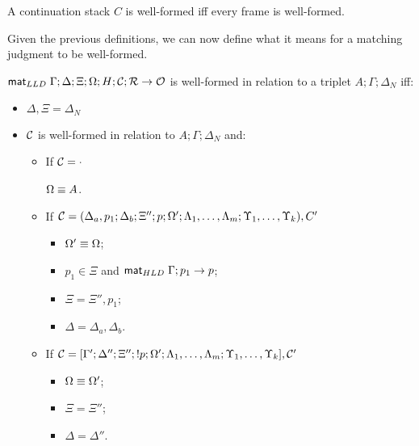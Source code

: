 \begin{definition}
A continuation stack $C$ is well-formed iff every frame is well-formed.
\end{definition}

Given the previous definitions, we can now define what it means for a matching
judgment to be well-formed.

\begin{definition}

$\mathsf{mat}_{LLD} \; \Gamma; \Delta; \Xi; \Omega; H; \mathcal{C}; \mathcal{R} \rightarrow \mathcal{O}$
is well-formed in relation to a triplet $A; \Gamma; \Delta_{N}$ iff:

\begin{itemize}[leftmargin=*]
   \item $\Delta, \Xi = \Delta_{N}$
   \item $\mathcal{C}$ is well-formed in relation to $A; \Gamma; \Delta_{N}$ and:
   \begin{itemize}[leftmargin=\secondm]
      \item If $\mathcal{C} = \cdot$
   
      $\Omega \equiv A$.
   
      \item If $\mathcal{C} = (\Delta_a, p_1; \Delta_b; \Xi''; p; \Omega'; \Lambda_1,
            \dotsc, \Lambda_m; \Upsilon_1, \dotsc, \Upsilon_k), C'$
   
      \begin{itemize}[leftmargin=\thirdm]
         \item $\Omega' \equiv \Omega$;
         \item $p_1 \in \Xi$ and $\mathsf{mat}_{HLD} \; \Gamma; p_1 \rightarrow p$;
         \item $\Xi = \Xi'', p_1$;
         \item $\Delta = \Delta_a, \Delta_b$.
      \end{itemize}
      \item If $\mathcal{C} = [\Gamma'; \Delta''; \Xi''; {!} p; \Omega'; \Lambda_1,
      \dotsc, \Lambda_m; \Upsilon_1, \dotsc, \Upsilon_k], \mathcal{C'}$
      \begin{itemize}[leftmargin=\thirdm]
         \item $\Omega \equiv \Omega'$;
         \item $\Xi = \Xi''$;
         \item $\Delta = \Delta''$.
      \end{itemize}
   \end{itemize}
\end{itemize}

\end{definition}


